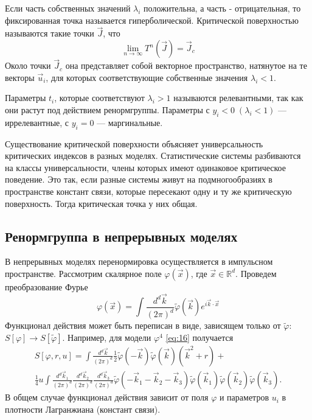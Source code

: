 \documentclass[a4paper,12pt]{article} \usepackage[utf8x]{inputenc} \usepackage[russian]{babel}
\theoremstyle{definition} \newtheorem{corollary}{Corollary}[theorem] \theoremstyle{definition}
\begin{document}
Если часть собственных значений $\lambda_i$ положительна, а часть - отрицательная, то фиксированная
точка называется гиперболической. Критической поверхностью называются такие точки $\vec J$, что
\begin{equation}
  \label{eq:63} \lim_{n\to \infty}T^n (\vec J)=\vec J_c
\end{equation} Около точки $\vec J_c$ она представляет собой векторное пространство, натянутое на те
векторы $\vec u_i$, для которых соответствующие собственные значения $\lambda_i<1$.

Параметры $t_i$, которые соответствуют $\lambda_i>1$ называются релевантными, так как они растут под
действием ренормгруппы. Параметры с $y_i<0 \; (\lambda_i<1)$ --- иррелевантные, с $y_i=0$ ---
маргинальные.

Существование критической поверхности объясняет универсальность критических индексов в разных
моделях. Статистические системы разбиваются на классы универсальности, члены которых имеют
одинаковое критическое поведение. Это так, если разные системы живут на подмногообразиях в
пространстве констант связи, которые пересекают одну и ту же критическую поверхность. Тогда
критическая точка у них общая.

\subsection{Ренормгруппа в непрерывных моделях}
\label{sec:renormgroup-general} В непрерывных моделях перенормировка осуществляется в импульсном
пространстве. Рассмотрим скалярное поле $\varphi(\vec x)$, где $\vec x\in \mathbb{R}^d$. Проведем
преобразование Фурье
\begin{equation}
  \label{eq:64} \varphi(\vec x)=\int \frac{d^d \vec k}{(2\pi)^d}\tilde \varphi(\vec k) e^{i\vec
k\cdot \vec x}
\end{equation} Функционал действия может быть переписан в виде, зависящем только от $\tilde\varphi$:
$S[\varphi]\to S[\tilde\varphi]$. Например, для модели $\varphi^4$ \eqref{eq:16} получается
\begin{multline}
  \label{eq:65} S[\varphi,r,u]=\int \frac{d^d \vec k}{(2\pi)^d} \frac{1}{2} \tilde\varphi(-\vec
k)\tilde\varphi(\vec k)(\vec k^2+r)+\\ \frac{1}{4}u\int \frac{d^d \vec k_1}{(2\pi)^d} \frac{d^d \vec
k_2}{(2\pi)^d} \frac{d^d \vec k_3}{(2\pi)^d} \tilde\varphi(-\vec k_1-\vec k_2 -\vec k_3)\tilde
\varphi(\vec k_1)\tilde\varphi (\vec k_2)\tilde\varphi(\vec k_3).
\end{multline} В общем случае функционал действия зависит от поля $\varphi$ и параметров $u_i$ в
плотности Лагранжиана (констант связи).
\end{document}
